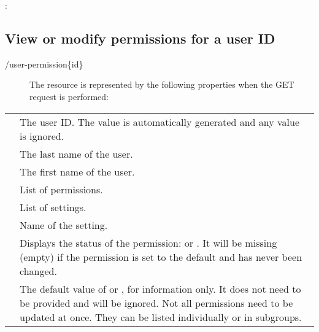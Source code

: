 \documentclass[letterpaper,10pt,english]{sphinxmanual}
\begin{document}
:

\begin{sphinxVerbatim}[commandchars=\\\{\}]
     
\end{sphinxVerbatim}


\subsection{View or modify permissions for a user ID}
\label{\detokenize{restapi:view-or-modify-permissions-for-a-user-id}}
 /user-permission\{id\}
\begin{description}
\item[{}] \leavevmode
The resource is represented by the following properties when the GET request is performed:

\end{description}


\begin{savenotes}\sphinxattablestart
\centering
\begin{tabulary}{\linewidth}[t]{|T|T|}
\hline

&
\\
\hline
{}
&
The user ID. The value is automatically generated and any value is ignored.
\\
\hline
{}
&
The last name of the user.
\\
\hline
{}
&
The first name of the user.
\\
\hline
{}
&
List of permissions.
\\
\hline
{}
&
List of settings.
\\
\hline
{}
&
Name of the setting.
\\
\hline
{}
&
Displays the status of the permission:  or . It will be missing (empty) if the permission is set to the default and has never been changed.
\\
\hline
{}
&
The default value of  or , for information only. It does not need to be provided and will be ignored. Not all permissions need to be updated at once. They can be listed individually or in subgroups.
\\
\hline
\end{tabulary}
\par
\sphinxattableend\end{savenotes}
\end{document}
